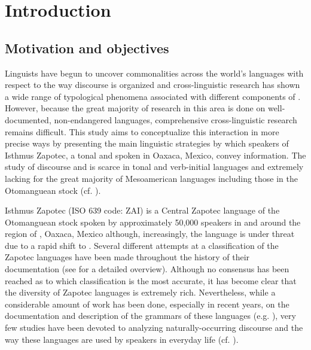 \chapter{Introduction}

\section{Motivation and objectives}

Linguists have begun to uncover commonalities across the world's languages with respect to the way discourse is organized and cross-linguistic research has shown a wide range of typological phenomena associated with different components of  \citep{bernini2006,mereu2009,erteschik2007}. However, because the great majority of research in this area is done on well-documented, non-endangered languages, comprehensive cross-linguistic research remains difficult. This study aims to conceptualize this interaction in more precise ways by presenting the main linguistic strategies by which speakers of Isthmus Zapotec, a tonal and  spoken in Oaxaca, Mexico, convey information. The study of discourse and  is scarce in tonal and verb-initial languages and extremely lacking for the great majority of Mesoamerican languages including those in the Otomanguean stock (cf. \citealt{camacho2010,lillehaugen2008,lillehaugen2016}). 

Isthmus Zapotec (ISO 639 code: ZAI) is a Central Zapotec language of the Otomanguean stock spoken by approximately 50,000 speakers in and around the region of , Oaxaca, Mexico although, increasingly, the language is under threat due to a rapid shift to . Several different attempts at a classification of the Zapotec languages have been made throughout the history of their documentation (see \citealt{smithstark2003,campbell2017a,campbell2017b} for a detailed overview). Although no consensus has been reached as to which classification is the most accurate, it has become clear that the diversity of Zapotec languages is extremely rich. Nevertheless, while a considerable amount of work has been done, especially in recent years, on the documentation and description of the grammars of these languages (e.g. \citealt{avelino2004,beamdeazcona2004,sonnenschein2005}), very few studies have been devoted to analyzing naturally-occurring discourse and the way these languages are used by speakers in everyday life (cf. \citealt{castillo2014}).

